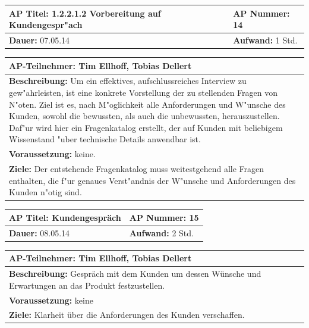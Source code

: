 \documentclass[fontsize=12pt,paper=a4,twoside]{scrartcl}
\begin{document}
\begin{tabular}{|p{7.43cm}|p{7.43cm}|}
\hline
\textbf{AP Titel: }1.2.2.1.2 Vorbereitung auf Kundengespr"ach & \textbf{AP Nummer: }14\\ 
\hline
\textbf{Dauer: }07.05.14 & \textbf{Aufwand: } 1 Std.\\
\hline
\end{tabular}
\begin{tabular}{|p{15.3cm}|}
\hline
\textbf{AP-Teilnehmer: }Tim Ellhoff, Tobias Dellert\\
\hline
\textbf{Beschreibung: }Um ein effektives, aufschlussreiches Interview zu gew"ahrleisten, ist eine konkrete Vorstellung der zu stellenden Fragen von N"oten. Ziel ist es, nach M"oglichkeit alle Anforderungen und W"unsche des Kunden, sowohl die bewussten, als auch die unbewussten, herauszustellen. Daf"ur wird hier ein Fragenkatalog erstellt, der auf Kunden mit beliebigem Wissenstand "uber technische Details anwendbar ist.\\
\hline
\textbf{Voraussetzung: }keine.\\
\hline 
\textbf{Ziele: }Der entstehende Fragenkatalog muss weitestgehend alle Fragen enthalten, die f"ur genaues Verst"andnis der W"unsche und Anforderungen des Kunden n"otig sind.\\
\hline 
\end{tabular}

\begin{tabular}{|p{7.43cm}|p{7.43cm}|}
\hline
\textbf{AP Titel: } Kundengespräch & \textbf{AP Nummer:} 15 \\ 
\hline
\textbf{Dauer: }08.05.14 & \textbf{Aufwand: }2 Std.\\
\hline
\end{tabular}
\begin{tabular}{|p{15.3cm}|}
\hline
\textbf{AP-Teilnehmer: }Tim Ellhoff, Tobias Dellert\\
\hline
\textbf{Beschreibung: }Gespräch mit dem Kunden um dessen Wünsche und Erwartungen an das Produkt festzustellen.\\
\hline
\textbf{Voraussetzung: }keine\\
\hline 
\textbf{Ziele: }Klarheit über die Anforderungen des Kunden verschaffen.\\
\hline 
\end{tabular}
\end{document}

